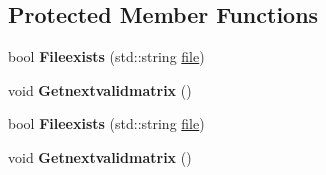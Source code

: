 \subsection*{Protected Member Functions}
\begin{DoxyCompactItemize}
\item 
\mbox{\label{class_eigen_1_1_matrix_market_iterator_a661385239e077ca4513e4e0a6127f1bc}} 
bool {\bfseries Fileexists} (std\+::string \hyperlink{structfile}{file})
\item 
\mbox{\label{class_eigen_1_1_matrix_market_iterator_a713cf5921bd4f3feb88e308fd6ad374e}} 
void {\bfseries Getnextvalidmatrix} ()
\item 
\mbox{\label{class_eigen_1_1_matrix_market_iterator_a661385239e077ca4513e4e0a6127f1bc}} 
bool {\bfseries Fileexists} (std\+::string \hyperlink{structfile}{file})
\item 
\mbox{\label{class_eigen_1_1_matrix_market_iterator_a713cf5921bd4f3feb88e308fd6ad374e}} 
void {\bfseries Getnextvalidmatrix} ()
\end{DoxyCompactItemize}
